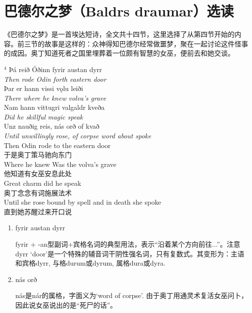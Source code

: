 \section{巴德尔之梦（Baldrs draumar）选读}
《巴德尔之梦》是一首埃达短诗，全文共十四节，这里选择了从第四节开始的内容。前三节的故事是这样的：众神得知巴德尔经常做噩梦，聚在一起讨论这件怪事的成因。奥丁知道死者之国里埋葬着一位颇有智慧的女巫，便前去和她交谈。
\begin{paracol}{2}
    \noindent
    $^4$ Þá reið Óðinn fyrir austan dyrr\\
    \textit{\MakeUppercase Then rode Odin forth eastern door}\\
    \MakeUppercase þar er hann vissi vǫlu leiði\\
    \textit{\MakeUppercase there where he knew volva's grave}\\
    \MakeUppercase nam hann vittugri valgaldr kveða\\
    \textit{\MakeUppercase did he skillful magic speak}\\
    \MakeUppercase unz nauðig reis, nás orð of kvað\\
    \textit{\MakeUppercase Until unwillingly rose, of corpse word about spoke}\\
    \switchcolumn
    \noindent
    Then Odin rode to the eastern door\\
    于是奥丁策马驰向东门\\
    Where he knew Was the volva's grave\\
    他知道有女巫安息此处\\
    Great charm did he speak\\
    奥丁念念有词施展法术\\
    Until she rose bound by spell and in death she spoke\\
    直到她苏醒过来开口说\\
\end{paracol}
\begin{grammar*}{}
    \begin{enumerate}[leftmargin=*]
        \item fyrir austan dyrr

              fyrir + -an型副词+宾格名词的典型用法，表示“沿着某个方向前往...”。注意dyrr `door'是一个特殊的辅音词干阴性强名词，只有复数式。其变形为：主语和宾格dyrr, 与格durum或dyrum, 属格dura或dyra.

        \item nás orð

              nás是nár的属格，字面义为`word of corpse'. 由于奥丁用通灵术复活女巫问卜，因此说女巫说出的是“死尸的话”。
    \end{enumerate}
\end{grammar*}

